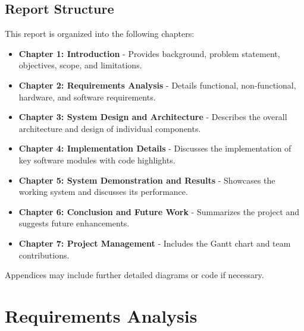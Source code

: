 \documentclass[12pt, a4paper]{report}
\begin{document}
\section{Report Structure}
This report is organized into the following chapters:
\begin{itemize}
    \item \textbf{Chapter 1: Introduction} - Provides background, problem statement, objectives, scope, and limitations.
    \item \textbf{Chapter 2: Requirements Analysis} - Details functional, non-functional, hardware, and software requirements.
    \item \textbf{Chapter 3: System Design and Architecture} - Describes the overall architecture and design of individual components.
    \item \textbf{Chapter 4: Implementation Details} - Discusses the implementation of key software modules with code highlights.
    \item \textbf{Chapter 5: System Demonstration and Results} - Showcases the working system and discusses its performance.
    \item \textbf{Chapter 6: Conclusion and Future Work} - Summarizes the project and suggests future enhancements.
    \item \textbf{Chapter 7: Project Management} - Includes the Gantt chart and team contributions.
\end{itemize}
Appendices may include further detailed diagrams or code if necessary.

\chapter{Requirements Analysis}
\end{document}
